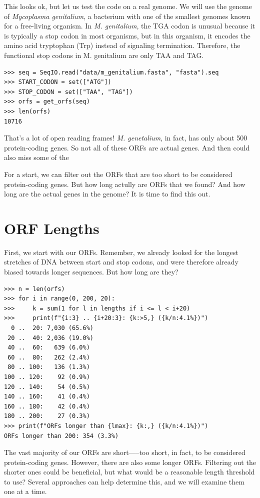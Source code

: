 This looks ok, but let us test the code on a real genome. We will use the genome of {\em Mycoplasma genitalium}, a bacterium with one of the smallest genomes known for a free-living organism. In {\em M. genitalium}, the TGA codon is unusual because it is typically a stop codon in most organisms, but in this organism, it encodes the amino acid tryptophan (Trp) instead of signaling termination. Therefore, the functional stop codons in M. genitalium are only TAA and TAG.

\vspace*{3mm}
\begin{lstlisting}
>>> seq = SeqIO.read("data/m_genitalium.fasta", "fasta").seq
>>> START_CODON = set(["ATG"])
>>> STOP_CODON = set(["TAA", "TAG"])
>>> orfs = get_orfs(seq)
>>> len(orfs)
10716
\end{lstlisting}

That's a lot of open reading frames! {\em M. genetalium}, in fact, has only about 500 protein-coding genes. So not all of these ORFs are actual genes. And then could also miss some of the 

For a start, we can filter out the ORFs that are too short to be considered protein-coding genes. But how long actully are ORFs that we found? And how long are the actual genes in the genome? It is time to find this out.

\section{ORF Lengths}

First, we start with our ORFs. Remember, we already looked for the longest stretches of DNA between start and stop codons, and were therefore already biased towards longer sequences. But how long are they?

\vspace*{3mm}
\begin{lstlisting}
>>> n = len(orfs)
>>> for i in range(0, 200, 20):
>>>     k = sum(1 for l in lengths if i <= l < i+20)
>>>     print(f"{i:3} .. {i+20:3}: {k:>5,} ({k/n:4.1%})")
  0 ..  20: 7,030 (65.6%)
 20 ..  40: 2,036 (19.0%)
 40 ..  60:   639 (6.0%)
 60 ..  80:   262 (2.4%)
 80 .. 100:   136 (1.3%)
100 .. 120:    92 (0.9%)
120 .. 140:    54 (0.5%)
140 .. 160:    41 (0.4%)
160 .. 180:    42 (0.4%)
180 .. 200:    27 (0.3%)
>>> print(f"ORFs longer than {lmax}: {k:,} ({k/n:4.1%})")
ORFs longer than 200: 354 (3.3%)
\end{lstlisting}

The vast majority of our ORFs are short—--too short, in fact, to be considered protein-coding genes. However, there are also some longer ORFs. Filtering out the shorter ones could be beneficial, but what would be a reasonable length threshold to use? Several approaches can help determine this, and we will examine them one at a time.

